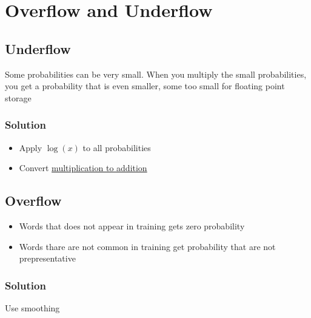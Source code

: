 \section{Overflow and Underflow}

  \subsection{Underflow}

    Some probabilities can be very small. When you multiply the small
    probabilities, you get a probability that is even smaller, some too
    small for floating point storage

    \subsubsection{Solution}

      \begin{itemize}
        \item Apply $ \log\left( x \right) $ to all probabilities
        \item Convert \ul{multiplication to addition}
      \end{itemize}

  \subsection{Overflow}

    \begin{itemize}
      \item Words that does not appear in training gets zero probability
      \item Words thare are not common in training get probability that are
      not prepresentative
    \end{itemize}

    \subsubsection{Solution}

      Use smoothing